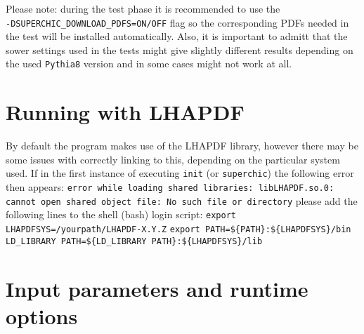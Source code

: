 \documentclass[12pt]{article}
\begin{document}
Please note: during the test phase it is recommended to use the \\ \texttt{-DSUPERCHIC\_DOWNLOAD\_PDFS=ON/OFF} flag so the 
corresponding PDFs needed in the test will be installed automatically. Also, it is important to admitt that the sower settings used in the tests 
might give slightly different results depending on the used \texttt{Pythia8} version and in some cases might not work at all.

\section{Running with LHAPDF}

By default the program makes use of the LHAPDF library, however there 
may be some issues with correctly linking to this, depending on the 
particular system used. 
If in the first instance of executing \texttt{init} (or
 \texttt{superchic}) the following error then appears:
\newline
\newline
\texttt{error while loading shared libraries: libLHAPDF.so.0: cannot 
open shared object file: No such file or directory}
\newline
\newline
please add the following lines to the shell (bash) login script:
\newline
\newline
\texttt{export LHAPDFSYS=/yourpath/LHAPDF-X.Y.Z}
\newline
\texttt{export PATH=\$\{PATH\}:\$\{LHAPDFSYS\}/bin}
\newline
\texttt{LD\_LIBRARY PATH=\$\{LD\_LIBRARY PATH\}:\$\{LHAPDFSYS\}/lib}


\section{Input parameters and runtime options}
\end{document}
